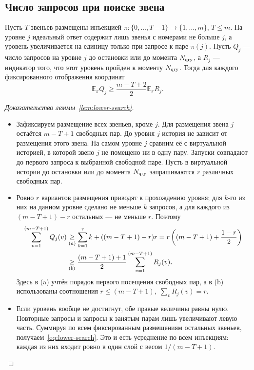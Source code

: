 \subsection{Число запросов при поиске звена}

\begin{lemma}\label{lem:lower-search}
Пусть $T$ звеньев размещены инъекцией
$\pi:\{0,\ldots,T-1\}\to\{1,\ldots,m\}$, $T\le m$.
На уровне $j$ идеальный ответ содержит лишь звенья с номерами
не больше $j$, а уровень увеличивается на единицу только при запросе
к паре $\pi(j)$. Пусть $Q_j$ --- число запросов на уровне
$j$ до остановки или до момента $N_{\rm qry}$, а $R_j$ --- индикатор
того, что этот уровень пройден к моменту $N_{\rm qry}$. Тогда для каждого
фиксированного отображения координат
\begin{equation}\label{eq:lower-search}
 \mathbb E_\pi Q_j\ge\frac{m-T+2}{2}\mathbb E_\pi R_j.
\end{equation}
\end{lemma}

\begin{proof}[Доказательство леммы~\ref{lem:lower-search}]
\leavevmode
\begin{itemize}
\item Зафиксируем размещение всех звеньев, кроме $j$.
Для размещения звена $j$ остаётся $m-T+1$ свободных пар.
До уровня $j$ история не зависит от размещения этого звена.
На самом уровне $j$ сравним её с виртуальной историей, в которой
звено $j$ не помещено ни в одну пару. Запуски совпадают до первого
запроса к выбранной свободной паре. Пусть в виртуальной истории
до остановки или до момента $N_{\rm qry}$ запрашиваются $r$ различных свободных пар.
\item Ровно $r$ вариантов размещения приводят к прохождению уровня;
для $k$-го из них на данном уровне сделано не меньше $k$ запросов,
а для каждого из $(m-T+1)-r$ остальных --- не меньше $r$.
Поэтому
\begin{align*}
 \sum_{v=1}^{(m-T+1)}Q_j(v)&\mathrel{\underset{(a)}{\ge}}
 \sum_{k=1}^r k+((m-T+1)-r)r =r\left((m-T+1)+\frac{1-r}{2}\right)
 \\&\mathrel{\underset{(b)}{\ge}}
 \frac{(m-T+1)+1}{2}\sum_{v=1}^{(m-T+1)}R_j(v).
\end{align*}
Здесь в (a) учтён порядок первого посещения свободных пар, а в (b) использованы соотношения $r\le (m-T+1),\;\sum_vR_j(v)=r$.

\item Если уровень вообще не достигнут, обе правые величины равны нулю.
Повторные запросы и запросы к занятым парам лишь увеличивают левую часть.
Суммируя по всем фиксированным размещениям остальных звеньев,
получаем~\eqref{eq:lower-search}. Это и есть усреднение по всем инъекциям:
каждая из них входит ровно в один слой с весом $1/(m-T+1)$.
\end{itemize}
\end{proof}


